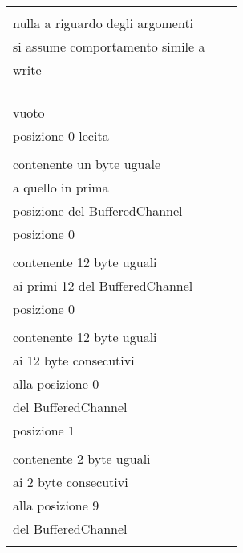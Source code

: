 \documentclass[10pt, a4paper]{article}
\newcommand{\Intmaketable}[4]{
	\begin{longtable}{#3}
	#4
	\caption{#2}
	\label{#1}
	\end{longtable}
}
\newcommand{\Inttestctable}[3]{
	\Intmaketable{#1}{#2}{|l|l|l|}{
	\hline
	\thead{Input} & \thead{Esito atteso} & \thead{Motivazione}\\
	\hline
	\hline
	#3
	\hline}
}
\newcommand{\Inttestccaption}[4]{Casi di test per metodo #1 di #2, iter. #3 (#4)}
\newcommand{\gettablelabel}[5]{table:#1:#2:#3:iter#4:proj#5}
\newcommand{\testctable}[5]{
	\Inttestctable{\gettablelabel{testc}{#1}{#2}{#3}{#4}}
		{\Inttestccaption{#1}{#2}{#3}{#4}}
		{#5}
}
\newcommand{\tcell}{\makecell[tl]}
\newcommand{\newtrow}{\\ \hline}
\def\bookkeeper{BookKeeper}
\begin{document}
	\testctable{read}{BufferedChannel}{1}{\bookkeeper}{
				\tcell{null, 0, 0} & 
				\tcell{NullPointerException viene lanciata} & 
				\tcell{
					La documentazione non specifica\\
					nulla a riguardo degli argomenti\\
					si assume comportamento simile a\\
					write} 
		\newtrow
			\tcell{ByteBuf(), -1, -1} & 
			\tcell{IllegalArgumentException viene lanciata} & 
			\tcell{pos e length non possono essere $<$ 0}	
		\newtrow
			\tcell{ByteBuf(), -1, 0} & 
			\tcell{IllegalArgumentException viene lanciata} & 
			\tcell{pos non può essere $<$ 0}
		\newtrow
			\tcell{ByteBuf(), 0, -1} & 
			\tcell{IllegalArgumentException viene lanciata} & 
			\tcell{length non può essere $<$ 0}
		\newtrow
			\tcell{ByteBuf(), 0, 0} & 
			\tcell{
				Buffer destinazione\\ 
				vuoto} & 
			\tcell{
				Lettura di 0 byte dalla\\
				posizione 0 lecita}
		\newtrow
			\tcell{ByteBuf(), 0, 1} & 
			\tcell{
				Buffer destinazione\\ 
				contenente un byte uguale\\ 
				a quello in prima\\ 
				posizione del BufferedChannel} & 
			 \tcell{
			 	Lettura di 1 byte dalla\\
			 	posizione 0}
		\newtrow
			\tcell{ByteBuf(), 0, 12} & 
			\tcell{
				Buffer destinazione\\ 
				contenente 12 byte uguali\\ 
				ai primi 12 del BufferedChannel} & 
			\tcell{
				Lettura di 12 byte dalla\\
				posizione 0}
		\newtrow
			\tcell{ByteBuf(), 1, 12} & 
			\tcell{
				Buffer destinazione\\ 
				contenente 12 byte uguali\\ 
				ai 12 byte consecutivi\\
				alla posizione 0\\ 
				del BufferedChannel} & 
			\tcell{
				Lettura di 12 byte dalla\\
				posizione 1}
		\newtrow
			\tcell{ByteBuf(), 10, 2} & 
			\tcell{
				Buffer destinazione\\ 
				contenente 2 byte uguali\\ 
				ai 2 byte consecutivi\\
				alla posizione 9\\ 
				del BufferedChannel} & 
			\tcell{
				Lettura di 2 byte dalla\\
}}
\end{document}
